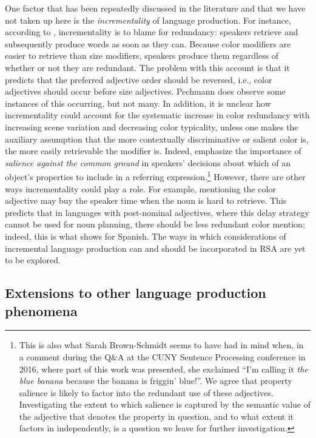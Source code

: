 \documentclass[11pt]{article}
\begin{document}
One factor that has been repeatedly discussed in the literature and that we have not taken up here is the \emph{incrementality} of language production. For instance, according to , incrementality is to blame for redundancy: speakers retrieve and subsequently produce words as soon as they can. Because color modifiers are easier to retrieve than size modifiers, speakers produce them regardless of whether or not they are redundant. The problem with this account is that it predicts that the preferred adjective order should be reversed, i.e., color adjectives should occur before size adjectives. Pechmann does observe some instances of this occurring, but not many. In addition, it is unclear how incrementality could account for the systematic increase in color redundancy with increasing scene variation and decreasing color typicality, unless one makes the auxiliary assumption that the more contextually discriminative or salient color is, the more easily retrievable the modifier is. Indeed,  emphasize the importance of \emph{salience against the common ground} in speakers' decisions about which of an object's properties to include in a referring expression.\footnote{This is also what Sarah Brown-Schmidt seems to have had in mind when, in a comment during the Q\&A at the CUNY Sentence Processing conference in 2016, where part of this work was presented, she exclaimed ``I'm calling it \emph{the blue banana} because the banana is friggin' blue!''. We agree that property salience is likely to factor into the redundant use of these adjectives. Investigating the extent to which salience is captured by the semantic value of the adjective that denotes the property in question, and to what extent it factors in independently, is a question we leave for further investigation.} However, there are other ways incrementality could play a role. For example, mentioning the color adjective may buy the speaker time when the noun is hard to retrieve. This predicts that in languages with post-nominal adjectives, where this delay strategy cannot be used for noun planning, there should be less redundant color mention; indeed, this is what  shows for Spanish. The ways in which considerations of incremental language production can and should be incorporated in RSA are yet to be explored.



\subsection{Extensions to other language production phenomena}
\end{document}
